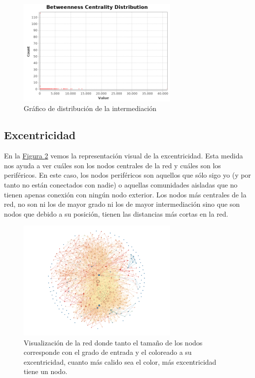 \documentclass[10pt,a4paper,spanish]{article}
\numberwithin{equation}{section} %
\numberwithin{figure}{section} %
\numberwithin{table}{section} %
\begin{document}
\begin{figure}[!h]
    \centering
    \includegraphics[width=0.7\textwidth]{distance-report/Betweenness-Centrality-Distribution}
    \caption{Gráfico de distribución de la intermediación}
    \label{bet}
\end{figure}

\subsection{Excentricidad}
En la \hyperref[excentricidad]{Figura \ref*{excentricidad}} vemos la representación visual de la excentricidad. Esta medida nos ayuda a ver cuáles son los nodos centrales de la red y cuáles son los periféricos. En este caso, los nodos periféricos son aquellos que sólo sigo yo (y por tanto no están conectados con nadie) o aquellas comunidades aisladas que no tienen apenas conexión con ningún nodo exterior. Los nodos más centrales de la red, no son ni los de mayor grado ni los de mayor intermediación sino que son nodos que debido a su posición, tienen las distancias más cortas en la red. 

\begin{figure}[!h]
    \centering
    \includegraphics[width=0.7\textwidth]{medidas_locales/excentricidad}
    \caption{Visualización de la red donde tanto el tamaño de los nodos corresponde con el grado de entrada y el coloreado a su excentricidad, cuanto más calido sea el color, más excentricidad tiene un nodo.}
    \label{excentricidad}
\end{figure}
\end{document}
